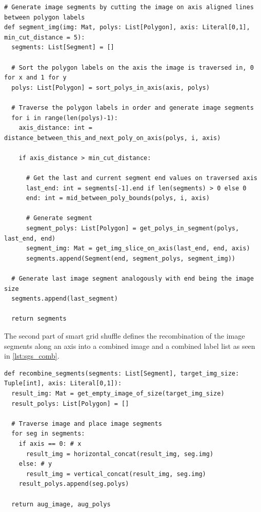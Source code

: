 \documentclass[10pt]{book}
\newenvironment{code}{\captionsetup{type=listing}}{}
\begin{document}
\begin{code}
\label{lst:sgs_cut}
\begin{verbatim}
# Generate image segments by cutting the image on axis aligned lines between polygon labels
def segment_img(img: Mat, polys: List[Polygon], axis: Literal[0,1], min_cut_distance = 5):
  segments: List[Segment] = []
  
  # Sort the polygon labels on the axis the image is traversed in, 0 for x and 1 for y
  polys: List[Polygon] = sort_polys_in_axis(axis, polys)
  
  # Traverse the polygon labels in order and generate image segments
  for i in range(len(polys)-1):
    axis_distance: int = distance_between_this_and_next_poly_on_axis(polys, i, axis)

    if axis_distance > min_cut_distance:

      # Get the last and current segment end values on traversed axis 
      last_end: int = segments[-1].end if len(segments) > 0 else 0
      end: int = mid_between_poly_bounds(polys, i, axis)

      # Generate segment
      segment_polys: List[Polygon] = get_polys_in_segment(polys, last_end, end)
      segment_img: Mat = get_img_slice_on_axis(last_end, end, axis)
      segments.append(Segment(end, segment_polys, segment_img))

  # Generate last image segment analogously with end being the image size
  segments.append(last_segment)
  
  return segments
\end{verbatim}
\end{code}

The second part of smart grid shuffle defines the recombination of the image segments along an axis into a combined image and a combined label list as seen in \autoref{lst:sgs_comb}.

\begin{code}
\label{lst:sgs_comb}
\begin{verbatim}
def recombine_segments(segments: List[Segment], target_img_size: Tuple[int], axis: Literal[0,1]):
  result_img: Mat = get_empty_image_of_size(target_img_size)
  result_polys: List[Polygon] = []

  # Traverse image and place image segments
  for seg in segments:
    if axis == 0: # x
      result_img = horizontal_concat(result_img, seg.img)
    else: # y
      result_img = vertical_concat(result_img, seg.img)
    result_polys.append(seg.polys)
    
  return aug_image, aug_polys
\end{verbatim}
\end{code}
\end{document}
